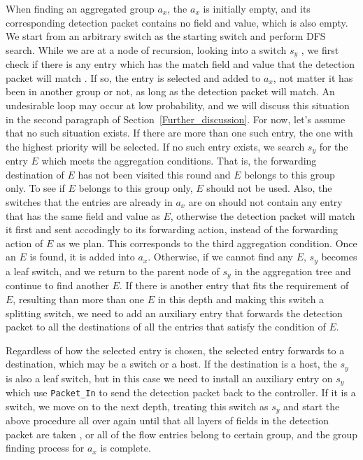 When finding an aggregated group $a_x$, the $a_x$ is initially empty, and its corresponding detection packet contains no field and value, which is also empty. We start from an arbitrary switch as the starting switch and perform DFS search. While we are at a node of recursion, looking into a switch $s_y$ \sout{}, we first check if there is any entry which has the match field and value that the detection packet will match \sout{}. If so, the entry is selected and added to $a_x$, not matter it has been in another group or not, as long as the detection packet will match. An undesirable loop may occur at low probability, and we will discuss this situation in the second paragraph of Section~\ref{Further_discussion}. For now, let's assume that no such situation exists. If there are more than one such entry, the one with the highest priority will be selected. If no such entry exists, we search $s_y$ for the entry $E$ which meets the aggregation conditions. That is, the forwarding destination of $E$ has not been visited this round and $E$ belongs to this group only. To see if $E$ belongs to this group only, $E$ should not be used. Also, the switches that the entries are already in $a_x$ are on should not
contain any entry that has the same field and value as $E$, \sout{}
otherwise the detection packet will match it first and sent accodingly to its forwarding action, instead of the forwarding action of $E$ as we plan. This corresponds to the third aggregation condition. Once an $E$ is found, it is added into $a_x$. Otherwise, if we cannot find any $E$, $s_y$ becomes a leaf switch, and we return to the parent node of $s_y$ in the aggregation tree and continue to find another $E$. If there is another entry that fits the requirement of $E$, resulting than more than one $E$ in this depth and making this switch a splitting switch, we need to add an auxiliary entry that forwards the detection packet to all the destinations of all the entries that satisfy the condition of $E$. \sout{}

Regardless of how the selected entry is chosen, the selected entry forwards to a destination, which may be a switch or a host. If the destination is a host, the $s_y$ is also a leaf switch, but in this case we need to install an auxiliary entry on $s_y$ which use \texttt{Packet\_In} to send the detection packet back to the controller. If it is a switch, we move on to the next depth, treating this switch as $s_y$ and start the above procedure all over again until that all layers of fields in the detection packet are taken \sout{}, or all of the flow entries belong to certain group, and the group finding process for $a_x$ is complete.

